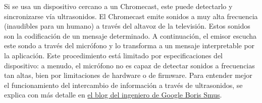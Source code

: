 Si se usa un dispositivo cercano a un Chromecast, este puede detectarlo y sincronizarse vía ultrasonidos.
El Chromecast emite sonidos a muy alta frecuencia (inaudibles para un humano) a través del altavoz de la televisión.
Estos sonidos son la codificación de un mensaje determinado.
A continuación, el emisor escucha este sondo a través del micrófono y lo transforma a un mensaje interpretable por la aplicación.
Este procedimiento está limitado por especificaciones del dispositivo: a menudo, el micrófono no es capaz de detectar sonidos a frecuencias tan altas, bien por limitaciones de hardware o de firmware.
Para entender mejor el funcionamiento del intercambio de información a través de ultrasonidos, se explica con más detalle en \href{http://smus.com/ultrasonic-networking/}{el blog del ingeniero de Google Boris Smus}.
